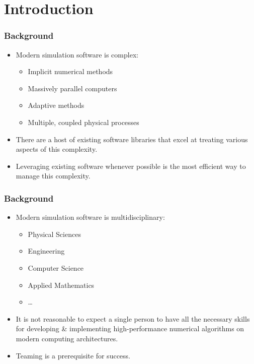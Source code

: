 




\section{Introduction}


\frame
{
  \frametitle{Background}                 

  \begin{itemize}
  \item Modern simulation software is \textcolor{nasablue}{complex}:
    \begin{itemize}
    \item Implicit numerical methods
    \item Massively parallel computers
    \item Adaptive methods
    \item Multiple, coupled physical processes
    \end{itemize}
  \item There are a host of existing software libraries that excel at treating various aspects of this complexity.
  \item Leveraging existing software whenever possible is the most efficient way to manage this complexity.

  \end{itemize}
}


 

\frame
{
  \frametitle{Background}                 

  \begin{itemize}
  \item Modern simulation software is \textcolor{nasablue}{multidisciplinary}:
    \begin{itemize}
    \item Physical Sciences
    \item Engineering
    \item Computer Science
    \item Applied Mathematics
    \item \ldots
    \end{itemize}
  \item It is not reasonable to expect a single person to have all the necessary skills for developing \& implementing high-performance numerical algorithms on modern computing architectures.
  \item Teaming is a prerequisite for success.
  \end{itemize}
}


